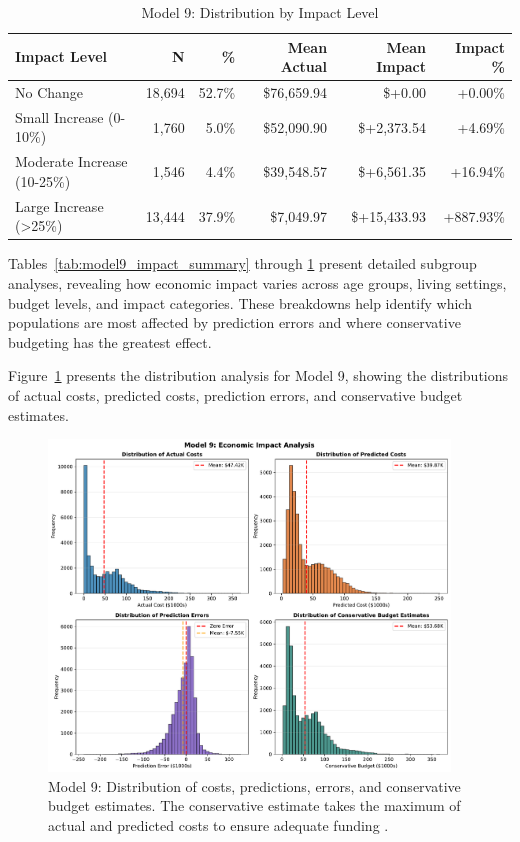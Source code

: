 \begin{table}[htbp]
\centering
\small
\caption{Model 9: Distribution by Impact Level \FiscalYear}
\label{tab:model9_impact_distribution}
\begin{tabular}{lrrrrr}
\toprule
\textbf{Impact Level} & \textbf{N} & \textbf{\%} & \textbf{Mean Actual} & \textbf{Mean Impact} & \textbf{Impact \%} \\
\midrule
No Change & 18,694 & 52.7\% & \$76,659.94 & \$+0.00 & +0.00\% \\
Small Increase (0-10\%) & 1,760 & 5.0\% & \$52,090.90 & \$+2,373.54 & +4.69\% \\
Moderate Increase (10-25\%) & 1,546 & 4.4\% & \$39,548.57 & \$+6,561.35 & +16.94\% \\
Large Increase (>25\%) & 13,444 & 37.9\% & \$7,049.97 & \$+15,433.93 & +887.93\% \\
\bottomrule
\end{tabular}
\end{table}

Tables~\ref{tab:model9_impact_summary} through \ref{tab:model9_impact_distribution} present detailed subgroup analyses, revealing how economic impact varies across age groups, living settings, budget levels, and impact categories. These breakdowns help identify which populations are most affected by prediction errors and where conservative budgeting has the greatest effect.

Figure~\ref{fig:model9_impact_histograms} presents the distribution analysis for Model 9, showing the distributions of actual costs, predicted costs, prediction errors, and conservative budget estimates.

\begin{figure}[htbp]
\centering
\includegraphics[width=0.95\textwidth]{figures/model_9_Impact_Histograms.pdf}
\caption{Model 9: Distribution of costs, predictions, errors, and conservative budget estimates. The conservative estimate takes the maximum of actual and predicted costs to ensure adequate funding \FiscalYear.}
\label{fig:model9_impact_histograms}
\end{figure}

